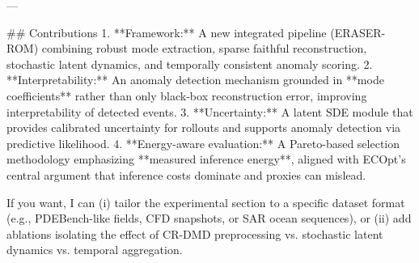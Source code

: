 ---

## Contributions  
1. **Framework:** A new integrated pipeline (ERASER-ROM) combining robust mode extraction, sparse faithful reconstruction, stochastic latent dynamics, and temporally consistent anomaly scoring.  
2. **Interpretability:** An anomaly detection mechanism grounded in **mode coefficients** rather than only black-box reconstruction error, improving interpretability of detected events.  
3. **Uncertainty:** A latent SDE module that provides calibrated uncertainty for rollouts and supports anomaly detection via predictive likelihood.  
4. **Energy-aware evaluation:** A Pareto-based selection methodology emphasizing **measured inference energy**, aligned with ECOpt’s central argument that inference costs dominate and proxies can mislead.  

If you want, I can (i) tailor the experimental section to a specific dataset format (e.g., PDEBench-like fields, CFD snapshots, or SAR ocean sequences), or (ii) add ablations isolating the effect of CR-DMD preprocessing vs. stochastic latent dynamics vs. temporal aggregation.